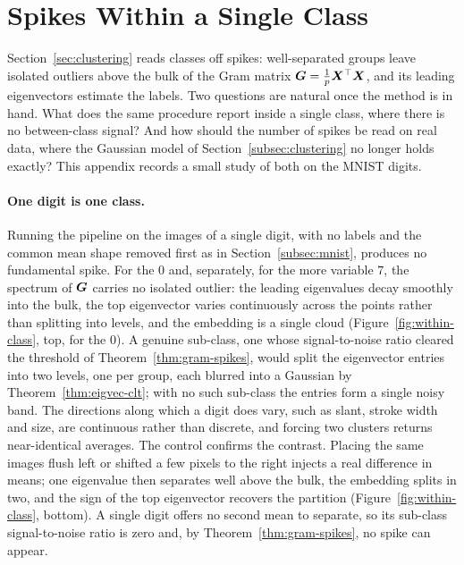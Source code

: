 
\section{Spikes Within a Single Class}\label{app:within-class}

Section~\ref{sec:clustering} reads classes off spikes: well-separated groups leave isolated outliers above the bulk of the Gram matrix \(\bm{G} = \frac{1}{p}\bm{X}^{\top}\bm{X}\), and its leading eigenvectors estimate the labels. Two questions are natural once the method is in hand. What does the same procedure report inside a single class, where there is no between-class signal? And how should the number of spikes be read on real data, where the Gaussian model of Section~\ref{subsec:clustering} no longer holds exactly? This appendix records a small study of both on the MNIST digits.

\paragraph{One digit is one class.} Running the pipeline on the images of a single digit, with no labels and the common mean shape removed first as in Section~\ref{subsec:mnist}, produces no fundamental spike. For the \(0\) and, separately, for the more variable \(7\), the spectrum of \(\bm{G}\) carries no isolated outlier: the leading eigenvalues decay smoothly into the bulk, the top eigenvector varies continuously across the points rather than splitting into levels, and the embedding is a single cloud (Figure~\ref{fig:within-class}, top, for the \(0\)). A genuine sub-class, one whose signal-to-noise ratio cleared the threshold of Theorem~\ref{thm:gram-spikes}, would split the eigenvector entries into two levels, one per group, each blurred into a Gaussian by Theorem~\ref{thm:eigvec-clt}; with no such sub-class the entries form a single noisy band. The directions along which a digit does vary, such as slant, stroke width and size, are continuous rather than discrete, and forcing two clusters returns near-identical averages. The control confirms the contrast. Placing the same images flush left or shifted a few pixels to the right injects a real difference in means; one eigenvalue then separates well above the bulk, the embedding splits in two, and the sign of the top eigenvector recovers the partition (Figure~\ref{fig:within-class}, bottom). A single digit offers no second mean to separate, so its sub-class signal-to-noise ratio is zero and, by Theorem~\ref{thm:gram-spikes}, no spike can appear.

